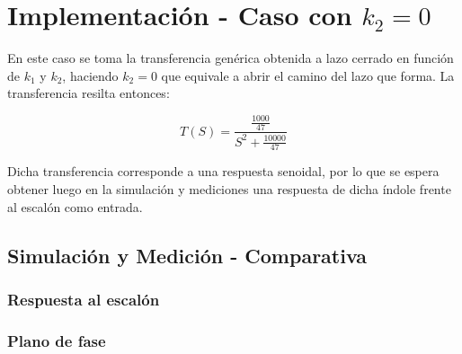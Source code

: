 \documentclass{article}
\begin{document}

\section{Implementación - Caso con $k_2 = 0$}

En este caso se toma la transferencia genérica obtenida a lazo cerrado en función de $k_1$ y $k_2$, haciendo $k_2 = 0$ que equivale a abrir el camino del lazo que forma. La transferencia resilta entonces:

\[
T(S) = \frac{\frac{1000}{47}}{S^2 + \frac{10000}{47}}
\]

Dicha transferencia corresponde a una respuesta senoidal, por lo que se espera obtener luego en la simulación y mediciones una respuesta de dicha índole frente al escalón como entrada.

\subsection{Simulación y Medición - Comparativa}

\subsubsection{Respuesta al escalón}

\subsubsection{Plano de fase}

\end{document}
